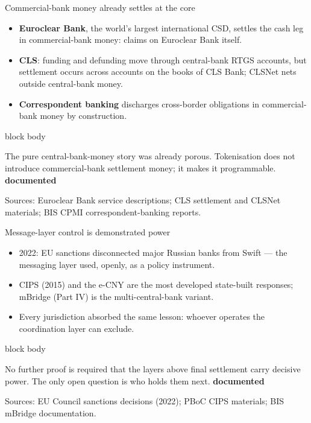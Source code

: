\documentclass[aspectratio=169,12pt]{beamer}
\newcommand{\rust}[1]{\textcolor{Rust}{\textbf{#1}}}
\newcommand{\source}[1]{\vfill\par\fontsize{5.4}{6.5}\selectfont\color{Quiet}Sources: #1}
\newcommand{\tightitems}{\setlength{\itemsep}{0.42em}\setlength{\parskip}{0pt}}
\newcommand{\tdoc}{\textcolor{Sage}{\bfseries documented}}
\newenvironment{statement}{%
  \begin{beamercolorbox}[sep=.18cm,rounded=false,wd=\linewidth]{block body}%
  \fontsize{13}{15.5}\selectfont\bfseries
}{\end{beamercolorbox}}
\begin{document}
\begin{frame}{Commercial-bank money already settles at the core}
  \begin{itemize}\tightitems
    \item \rust{Euroclear Bank}, the world's largest international CSD, settles the cash leg in commercial-bank money: claims on Euroclear Bank itself.
    \item \rust{CLS}: funding and defunding move through central-bank RTGS accounts, but settlement occurs across accounts on the books of CLS Bank; CLSNet nets outside central-bank money.
    \item \rust{Correspondent banking} discharges cross-border obligations in commercial-bank money by construction.
  \end{itemize}
  \vspace{0.12cm}
  \begin{statement}
    The pure central-bank-money story was already porous. Tokenisation does not introduce commercial-bank settlement money; it makes it programmable. \hfill\tdoc
  \end{statement}
  \source{Euroclear Bank service descriptions; CLS settlement and CLSNet materials; BIS CPMI correspondent-banking reports.}
\end{frame}

\begin{frame}{Message-layer control is demonstrated power}
  \begin{itemize}\tightitems
    \item 2022: EU sanctions disconnected major Russian banks from Swift --- the messaging layer used, openly, as a policy instrument.
    \item CIPS (2015) and the e-CNY are the most developed state-built responses; mBridge (Part IV) is the multi-central-bank variant.
    \item Every jurisdiction absorbed the same lesson: whoever operates the coordination layer can exclude.
  \end{itemize}
  \vspace{0.28cm}
  \begin{statement}
    No further proof is required that the layers above final settlement carry decisive power. The only open question is who holds them next. \hfill\tdoc
  \end{statement}
  \source{EU Council sanctions decisions (2022); PBoC CIPS materials; BIS mBridge documentation.}
\end{frame}
\end{document}

